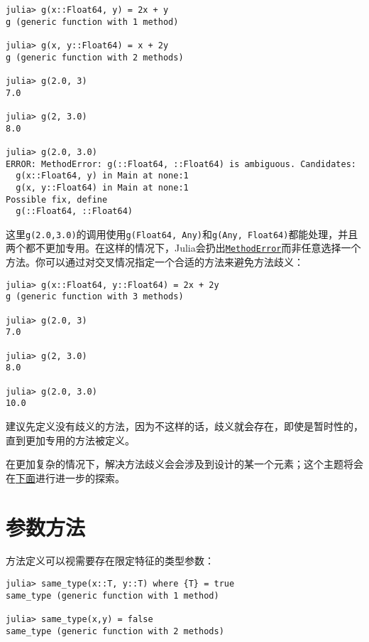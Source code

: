 \begin{verbatim}
julia> g(x::Float64, y) = 2x + y
g (generic function with 1 method)

julia> g(x, y::Float64) = x + 2y
g (generic function with 2 methods)

julia> g(2.0, 3)
7.0

julia> g(2, 3.0)
8.0

julia> g(2.0, 3.0)
ERROR: MethodError: g(::Float64, ::Float64) is ambiguous. Candidates:
  g(x::Float64, y) in Main at none:1
  g(x, y::Float64) in Main at none:1
Possible fix, define
  g(::Float64, ::Float64)
\end{verbatim}



这里\texttt{g(2.0,3.0)}的调用使用\texttt{g(Float64, Any)}和\texttt{g(Any, Float64)}都能处理，并且两个都不更加专用。在这样的情况下，Julia会扔出\hyperlink{68769522931907606}{\texttt{MethodError}}而非任意选择一个方法。你可以通过对交叉情况指定一个合适的方法来避免方法歧义：




\begin{verbatim}
julia> g(x::Float64, y::Float64) = 2x + 2y
g (generic function with 3 methods)

julia> g(2.0, 3)
7.0

julia> g(2, 3.0)
8.0

julia> g(2.0, 3.0)
10.0
\end{verbatim}



建议先定义没有歧义的方法，因为不这样的话，歧义就会存在，即使是暂时性的，直到更加专用的方法被定义。



在更加复杂的情况下，解决方法歧义会会涉及到设计的某一个元素；这个主题将会在\hyperlink{15846346227037149553}{下面}进行进一步的探索。



\hypertarget{14064657876301533350}{}


\section{参数方法}



方法定义可以视需要存在限定特征的类型参数：




\begin{verbatim}
julia> same_type(x::T, y::T) where {T} = true
same_type (generic function with 1 method)

julia> same_type(x,y) = false
same_type (generic function with 2 methods)
\end{verbatim}



